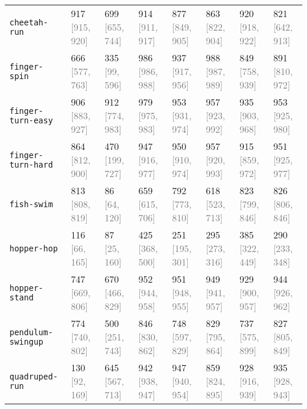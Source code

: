 \begin{table}[h]
{{\begin{tabular}{llllllll}
\texttt{cheetah-run} & 917 \textcolor{gray}{[915, 920]} & 699 \textcolor{gray}{[655, 744]} & 914 \textcolor{gray}{[911, 917]} & 877 \textcolor{gray}{[849, 905]} & 863 \textcolor{gray}{[822, 904]} & 920 \textcolor{gray}{[918, 922]} & 821 \textcolor{gray}{[642, 913]}  \\
\texttt{finger-spin} & 666 \textcolor{gray}{[577, 763]} & 335 \textcolor{gray}{[99, 596]} & 986 \textcolor{gray}{[986, 988]} & 937 \textcolor{gray}{[917, 956]} & 988 \textcolor{gray}{[987, 989]} & 849 \textcolor{gray}{[758, 939]} & 891 \textcolor{gray}{[810, 972]} \\
\texttt{finger-turn-easy} & 906 \textcolor{gray}{[883, 927]} & 912 \textcolor{gray}{[774, 983]} & 979 \textcolor{gray}{[975, 983]} & 953 \textcolor{gray}{[931, 974]} & 957 \textcolor{gray}{[923, 992]} & 935 \textcolor{gray}{[903, 968]} & 953 \textcolor{gray}{[925, 980]} \\
\texttt{finger-turn-hard} & 864 \textcolor{gray}{[812, 900]} & 470 \textcolor{gray}{[199, 727]} & 947 \textcolor{gray}{[916, 977]} & 950 \textcolor{gray}{[910, 974]} & 957 \textcolor{gray}{[920, 993]} & 915 \textcolor{gray}{[859, 972]} & 951 \textcolor{gray}{[925, 977]} \\
\texttt{fish-swim} & 813 \textcolor{gray}{[808, 819]} & 86 \textcolor{gray}{[64, 120]} & 659 \textcolor{gray}{[615, 706]} & 792 \textcolor{gray}{[773, 810]} & 618 \textcolor{gray}{[523, 713]} & 823 \textcolor{gray}{[799, 846]} & 826 \textcolor{gray}{[806, 846]} \\
\texttt{hopper-hop} & 116 \textcolor{gray}{[66, 165]} & 87 \textcolor{gray}{[25, 160]} & 425 \textcolor{gray}{[368, 500]} & 251 \textcolor{gray}{[195, 301]} & 295 \textcolor{gray}{[273, 316]} & 385 \textcolor{gray}{[322, 449]} & 290 \textcolor{gray}{[233, 348]} \\
\texttt{hopper-stand} & 747 \textcolor{gray}{[669, 806]} & 670 \textcolor{gray}{[466, 829]} & 952 \textcolor{gray}{[944, 958]} & 951 \textcolor{gray}{[948, 955]} & 949 \textcolor{gray}{[941, 957]} & 929 \textcolor{gray}{[900, 957]} & 944 \textcolor{gray}{[926, 962]} \\
\texttt{pendulum-swingup} & 774 \textcolor{gray}{[740, 802]} & 500 \textcolor{gray}{[251, 743]} & 846 \textcolor{gray}{[830, 862]} & 748 \textcolor{gray}{[597, 829]} & 829 \textcolor{gray}{[795, 864]} & 737 \textcolor{gray}{[575, 899]} & 827 \textcolor{gray}{[805, 849]} \\
\texttt{quadruped-run} & 130 \textcolor{gray}{[92, 169]} & 645 \textcolor{gray}{[567, 713]} & 942 \textcolor{gray}{[938, 947]} & 947 \textcolor{gray}{[940, 954]} & 859 \textcolor{gray}{[824, 895]} & 928 \textcolor{gray}{[916, 939]} & 935 \textcolor{gray}{[928, 943]} \\

\end{tabular}}}
\end{table}
